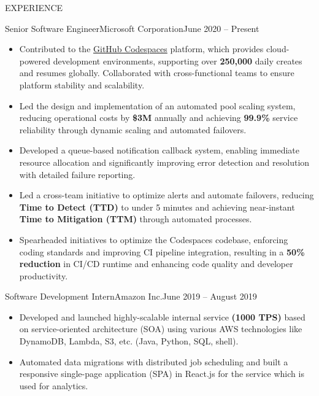 \documentclass[]{mcdowellcv}
\begin{document}
	\makeheader
	
	\begin{cvsection}{EXPERIENCE}
	    \begin{cvsubsection}{Senior Software Engineer}{Microsoft Corporation}{June 2020 -- Present}
			\begin{itemize}
				\item Contributed to the \href{https://github.com/features/codespaces/}{GitHub Codespaces} platform, which provides cloud-powered development environments, supporting over \textbf{250,000} daily creates and resumes globally. Collaborated with cross-functional teams to ensure platform stability and scalability.
                    \item Led the design and implementation of an automated pool scaling system, reducing operational costs by \textbf{\$3M} annually and achieving \textbf{99.9\%} service reliability through dynamic scaling and automated failovers.
                    \item Developed a queue-based notification callback system, enabling immediate resource allocation and significantly improving error detection and resolution with detailed failure reporting.
                    \item Led a cross-team initiative to optimize alerts and automate failovers, reducing \textbf{Time to Detect (TTD)} to under 5 minutes and achieving near-instant \textbf{Time to Mitigation (TTM)} through automated processes.
                    \item Spearheaded initiatives to optimize the Codespaces codebase, enforcing coding standards and improving CI pipeline integration, resulting in a \textbf{50\% reduction} in CI/CD runtime and enhancing code quality and developer productivity.
			\end{itemize}
   
		\end{cvsubsection}
		
	    \begin{cvsubsection}{Software Development Intern}{Amazon Inc.}{June 2019 -- August 2019}
			\begin{itemize}
				\item Developed and launched highly-scalable internal service \textbf{(1000 TPS)} based on service-oriented architecture (SOA) using various AWS technologies like DynamoDB, Lambda, S3, etc. (Java, Python, SQL, shell).
				\item Automated data migrations with distributed job scheduling and built a responsive single-page application (SPA) in React.js for the service which is used for analytics.
			\end{itemize}
		\end{cvsubsection}
		

\end{cvsection}
\end{document}
